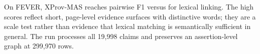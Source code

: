 \documentclass[graybox]{svmult}
\begin{document}
\begin{table}[t]
\centering
\caption{Primary provenance-composition results. Values are means over query records; source F1 is the upstream retrieval ceiling.}
\label{tab:primary}
\small
{}
\end{table}

On FEVER, XProv-MAS reaches pairwise F1 \FEVERXProvFOne{} versus \FEVERLexicalFOne{} for lexical linking. The high scores reflect short, page-level evidence surfaces with distinctive words; they are a scale test rather than evidence that lexical matching is semantically sufficient in general. The run processes all 19,998 claims and preserves an assertion-level graph at 299,970 rows.
\end{document}
